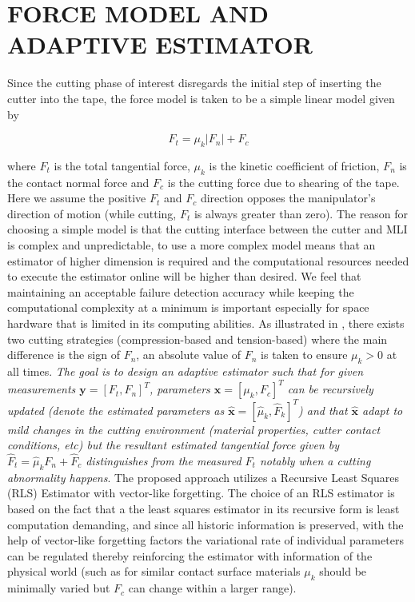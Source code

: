 \documentclass[letterpaper, 10 pt, conference]{ieeeconf}  %
\begin{document}
\section{FORCE MODEL AND ADAPTIVE ESTIMATOR}
\label{sec:2}
Since the cutting phase of interest disregards the initial step of inserting the cutter into the tape, the force model is taken to be a simple linear model given by 

\begin{equation}
F_t = \mu_k |F_n| + F_c
\label{eq:1}
\end{equation}


\noindent where $F_t$ is the total tangential force, $\mu_k$ is the kinetic coefficient of friction, $F_n$ is the contact normal force and $F_c$ is the cutting force due to shearing of the tape. Here we assume the positive $F_t$ and $F_c$ direction opposes the manipulator\rq{}s direction of motion (while cutting, $F_t$ is always greater than zero). The reason for choosing a simple model is that the cutting interface between the cutter and MLI is complex and unpredictable, to use a more complex model means that an estimator of higher dimension is required and the computational resources needed to execute the estimator online will be higher than desired. We feel that maintaining an acceptable failure detection accuracy while keeping the computational complexity at a minimum is important especially for space hardware that is limited in its computing abilities. As illustrated in \cite{isha}, there exists two cutting strategies (compression-based and tension-based) where the main difference is the sign of $F_n$,  an absolute value of $F_n$ is taken to ensure $\mu_k > 0$ at all times. \textit{The goal is to design an adaptive estimator such that for given measurements $\boldsymbol y = [F_t, F_n]^T$, parameters $\boldsymbol x = [\mu_k, F_c]^T$ can be recursively updated (denote the estimated parameters as $\hat{\boldsymbol x} = [\hat{\mu}_k, \hat{F}_k]^T$) and that $\hat{\boldsymbol x}$ adapt to mild changes in the cutting environment (material properties, cutter contact conditions, etc) but the resultant estimated tangential force given by $\hat{F}_t = \hat{\mu}_k F_n + \hat{F}_c $ distinguishes from the measured $F_t$ notably when a cutting abnormality happens}. The proposed approach utilizes a Recursive Least Squares (RLS) Estimator with vector-like forgetting. The choice of an RLS estimator is based on the fact that a the least squares estimator in its recursive form is least computation demanding, and since all historic information is preserved, with the help of vector-like forgetting factors the variational rate of individual parameters can be regulated thereby reinforcing the estimator with information of the physical world (such as for similar contact surface materials $\mu_k$ should be minimally varied but $F_c$ can change within a larger range). 
\end{document}
